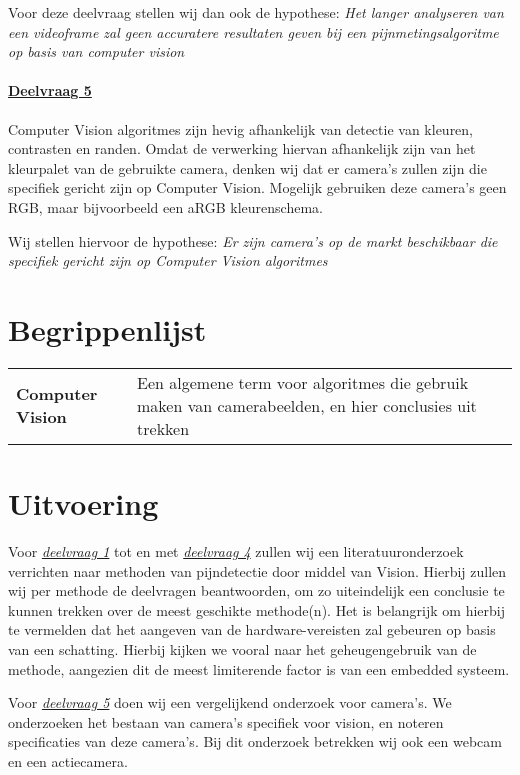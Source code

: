\documentclass[11pt]{article}
\begin{document}
    Voor deze deelvraag stellen wij dan ook de hypothese: \emph{Het langer analyseren van een videoframe zal geen accuratere resultaten geven bij een pijnmetingsalgoritme op basis van computer vision}

    \paragraph{\hyperref[itm:dv5]{Deelvraag 5}}
    Computer Vision algoritmes zijn hevig afhankelijk van detectie van kleuren, contrasten en randen.
    Omdat de verwerking hiervan afhankelijk zijn van het kleurpalet van de gebruikte camera, denken wij dat er camera's zullen zijn die specifiek gericht zijn op Computer Vision.
    Mogelijk gebruiken deze camera's geen RGB, maar bijvoorbeeld een aRGB kleurenschema.

    Wij stellen hiervoor de hypothese: \emph{Er zijn camera's op de markt beschikbaar die specifiek gericht zijn op Computer Vision algoritmes}


    \section{Begrippenlijst}
    \begin{tabular}{p{10em} p{21em}}
        \textbf{Computer Vision} & Een algemene term voor algoritmes die gebruik maken van camerabeelden, en hier conclusies uit trekken\\

    \end{tabular}


    \section{Uitvoering}

    Voor \emph{\hyperref[itm:dv1]{deelvraag 1}} tot en met \emph{\hyperref[itm:dv4]{deelvraag 4}} zullen wij een literatuuronderzoek
    verrichten naar methoden van pijndetectie door middel van Vision.
    Hierbij zullen wij per methode de deelvragen beantwoorden, om zo uiteindelijk een conclusie te kunnen trekken over
    de meest geschikte methode(n).
    Het is belangrijk om hierbij te vermelden dat het aangeven van de hardware-vereisten
    zal gebeuren op basis van een schatting.
    Hierbij kijken we vooral naar het geheugengebruik van de methode,
    aangezien dit de meest limiterende factor is van een embedded systeem.


    Voor \emph{\hyperref[itm:dv1]{deelvraag 5}} doen wij een vergelijkend onderzoek voor camera's.
    We onderzoeken het bestaan van camera's specifiek voor vision, en noteren specificaties van deze camera's.
    Bij dit onderzoek betrekken wij ook een webcam en een actiecamera.
\end{document}
